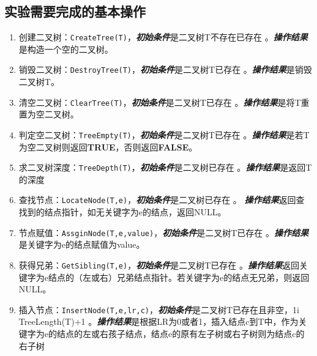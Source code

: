 \subsection{实验需要完成的基本操作}
\begin{enumerate}
\item 创建二叉树：\texttt{CreateTree(T)}，\newline \textbf{\emph{初始条件}}是二叉树T不存在已存在 。\newline \textbf{\emph{操作结果}}是构造一个空的二叉树。
\item 销毁二叉树：\texttt{DestroyTree(T)}，\newline \textbf{\emph{初始条件}}是二叉树T已存在 。\newline \textbf{\emph{操作结果}}是销毁二叉树T。
\item 清空二叉树：\texttt{ClearTree(T)}，\newline \textbf{\emph{初始条件}}是二叉树T已存在 。\newline \textbf{\emph{操作结果}}是将T重置为空二叉树。
\item 判定空二叉树：\texttt{TreeEmpty(T)}，\newline \textbf{\emph{初始条件}}是二叉树T已存在 。\newline \textbf{\emph{操作结果}}是若T为空二叉树则返回\textbf{TRUE}，否则返回\textbf{FALSE}。
\item 求二叉树深度：\texttt{TreeDepth(T)}，\newline \textbf{\emph{初始条件}}是二叉树已存在 。\newline \textbf{\emph{操作结果}}是返回T的深度
\item 查找节点：\texttt{LocateNode(T,e)}，\newline \textbf{\emph{初始条件}}是二叉树已存在 。\newline
    \textbf{\emph{操作结果}}返回查找到的结点指针，如无关键字为e的结点，返回NULL。
\item 节点赋值：\texttt{AssginNode(T,e,value)}，\newline \textbf{\emph{初始条件}}是二叉树T已存在 。\newline \textbf{\emph{操作结果}}是关键字为e的结点赋值为value。
\item 获得兄弟：\texttt{GetSibling(T,e)}，\newline \textbf{\emph{初始条件}}是二叉树T已存在 。\newline \textbf{\emph{操作结果}}返回关键字为e结点的（左或右）兄弟结点指针。若关键字为e的结点无兄弟，则返回NULL。
\item 插入节点：\texttt{InsertNode(T,e,lr,c)}，\newline \textbf{\emph{初始条件}}是二叉树T已存在且非空，1\le i \le TreeLength(T)+1 。\newline \textbf{\emph{操作结果}}是根据LR为0或者1，插入结点c到T中，作为关键字为e的结点的左或右孩子结点，结点e的原有左子树或右子树则为结点c的右子树

\end{enumerate}
